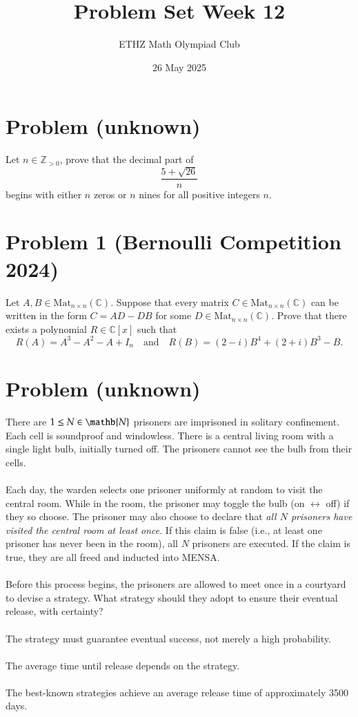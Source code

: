 \documentclass[11pt, a4paper, oneside]{article}
\title{Problem Set Week 12}
\author{ETHZ Math Olympiad Club}
\date{26 May 2025}
\newcommand{\problem}[1][]{\section{#1} \hfill \par}
\theoremstyle{remark}
\theoremstyle{lemma}
\begin{document}
\maketitle
\problem[Problem (unknown)]
Let $n\in\mathbb{Z}_{>0}$, prove that the decimal part of
\[
\frac{5 + \sqrt{26}}{n}
\]
begins with either $n$ zeros or $n$ nines for all positive integers $n$.



\problem[Problem 1 (Bernoulli Competition 2024)]
Let \( A, B \in \mathrm{Mat}_{n \times n}(\mathbb{C}) \). Suppose that every matrix \( C \in \mathrm{Mat}_{n \times n}(\mathbb{C}) \) can be written in the form \( C = AD - DB \) for some \( D \in \mathrm{Mat}_{n \times n}(\mathbb{C}) \). Prove that there exists a polynomial \( R \in \mathbb{C}[x] \) such that
\[
R(A) = A^3 - A^2 - A + I_n \quad \text{and} \quad R(B) = (2 - i)B^4 + (2 + i)B^3 - B.
\]




\problem[Problem (unknown)]
There are $1\leq N\in\mathb{N}$ prisoners are imprisoned in solitary confinement. Each cell is soundproof and windowless. There is a central living room with a single light bulb, initially turned off. The prisoners cannot see the bulb from their cells.
\\\\
Each day, the warden selects one prisoner uniformly at random to visit the central room. While in the room, the prisoner may toggle the bulb (on $\leftrightarrow$ off) if they so choose. The prisoner may also choose to declare that \textit{all $N$ prisoners have visited the central room at least once}. If this claim is false (i.e., at least one prisoner has never been in the room), all $N$ prisoners are executed. If the claim is true, they are all freed and inducted into MENSA.
\\\\
Before this process begins, the prisoners are allowed to meet once in a courtyard to devise a strategy. What strategy should they adopt to ensure their eventual release, with certainty?
\\\\
The strategy must guarantee eventual success, not merely a high probability.
\\\\
The average time until release depends on the strategy.
\\\\
The best-known strategies achieve an average release time of approximately 3500 days.
\end{document}
